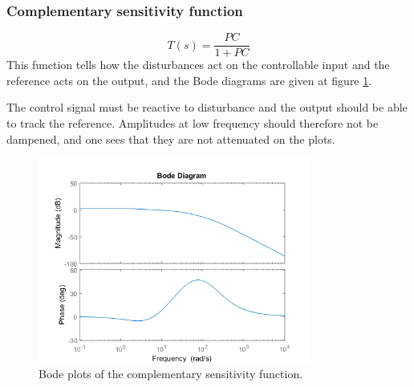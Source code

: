 \subsubsection{Complementary sensitivity function}
$$
T(s) = \dfrac{PC}{1 + PC}
$$
This function tells how the disturbances act on the controllable input and the reference acts on the output, and the Bode diagrams are given at figure \ref{fig:complementary-sensitivity}.\par
The control signal must be reactive to disturbance and the output should be able to track the reference. Amplitudes at low frequency should therefore not be dampened, and one sees that they are not attenuated on the plots.
\begin{figure}[H]
    \centering
    \includegraphics[width=0.8\textwidth]{resources/png/complementary-sensitivity.png}
    \caption{Bode plots of the complementary sensitivity function.}
    \label{fig:complementary-sensitivity}
\end{figure}

